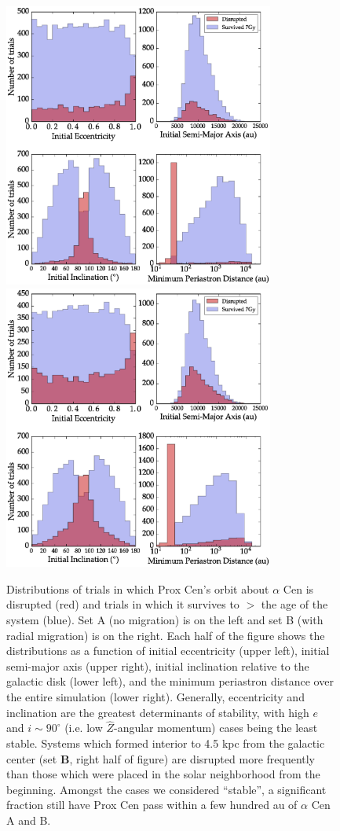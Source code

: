 \documentclass[preprint,12pt]{aastex}
\begin{document}
\begin{figure}
\includegraphics[width=3.5in]{nomigrdist.eps}
\includegraphics[width=3.5in]{migrdist.eps}
\caption{Distributions of trials in which Prox Cen's orbit about $\alpha$ Cen
  is disrupted (red) and trials in which it survives to $>$ the age of the 
  system (blue). Set {A} (no migration) is on the left and set {B} (with 
  radial migration) is on the right. Each half of the figure shows the 
  distributions as a function of initial eccentricity (upper left), initial 
  semi-major axis (upper right), initial inclination relative to the galactic 
  disk (lower left), and the minimum periastron distance over the entire 
  simulation (lower right). Generally, eccentricity and inclination are the 
  greatest determinants of stability, with high $e$ and $i \sim 90^{\circ}$ 
  (i.e. low $\hat{Z}$-angular momentum) cases being the least stable. 
  Systems which formed interior to 4.5 kpc from the galactic center 
  (set \textbf{B}, right half of figure) are disrupted more frequently than 
  those which were placed in the solar neighborhood from the beginning. 
  Amongst the cases we considered ``stable'', a significant fraction still 
  have Prox Cen pass within a few hundred au of $\alpha$ Cen A and B.}
\label{fig:galacdist}
\end{figure}
\end{document}
